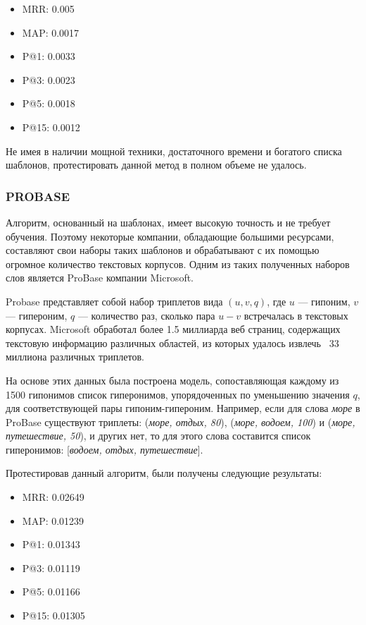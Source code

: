\begin{itemize}
\item MRR: 0.005
\item MAP: 0.0017
\item P@1: 0.0033
\item P@3: 0.0023
\item P@5: 0.0018
\item P@15: 0.0012
\end{itemize}

Не имея в наличии мощной техники, достаточного времени и богатого списка
шаблонов, протестировать данной метод в полном объеме не удалось.

\subsubsection{PROBASE}

Алгоритм, основанный на шаблонах, имеет высокую точность и не требует обучения.
Поэтому некоторые компании, обладающие большими ресурсами, составляют свои наборы
таких шаблонов и обрабатывают с их помощью огромное количество текстовых корпусов.
Одним из таких полученных наборов слов является ProBase компании Microsoft.

Probase представляет собой набор триплетов вида $(u, v, q)$, где $u$ — гипоним, $v$ —
гипероним, $q$ — количество раз, сколько пара $u-v$ встречалась в текстовых корпусах.
Microsoft обработал более 1.5 миллиарда веб страниц, содержащих текстовую
информацию различных областей, из которых удалось извлечь ~33 миллиона различных
триплетов.

На основе этих данных была построена модель, сопоставляющая каждому из 1500 гипонимов список гиперонимов, упорядоченных по уменьшению значения $q$, для соответствующей пары гипоним-гипероним. Например, если для слова \textit{море} в ProBase существуют триплеты: (\textit{море, отдых, 80}), (\textit{море, водоем, 100}) и (\textit{море, путешествие, 50}), и
других нет, то для этого слова составится список гиперонимов: [\textit{водоем, отдых,
путешествие}].

Протестировав данный алгоритм, были получены следующие результаты:


\begin{itemize}
\item MRR: 0.02649
\item MAP: 0.01239
\item P@1: 0.01343
\item P@3: 0.01119
\item P@5: 0.01166
\item P@15: 0.01305
\end{itemize}


